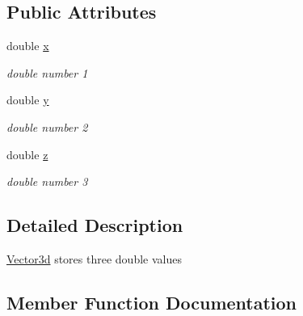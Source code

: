 \subsection*{Public Attributes}
\begin{DoxyCompactItemize}
\item 
\mbox{\label{classCPlantBox_1_1Vector3d_a5be396386dceda4e3f0847a760e67c08}} 
double \hyperlink{classCPlantBox_1_1Vector3d_a5be396386dceda4e3f0847a760e67c08}{x}
\begin{DoxyCompactList}\small\item\em double number 1 \end{DoxyCompactList}\item 
\mbox{\label{classCPlantBox_1_1Vector3d_a2c3ab20e8adc6170236011246f59d4b4}} 
double \hyperlink{classCPlantBox_1_1Vector3d_a2c3ab20e8adc6170236011246f59d4b4}{y}
\begin{DoxyCompactList}\small\item\em double number 2 \end{DoxyCompactList}\item 
\mbox{\label{classCPlantBox_1_1Vector3d_adbb591ec0af9aa04c331f752b9d06f54}} 
double \hyperlink{classCPlantBox_1_1Vector3d_adbb591ec0af9aa04c331f752b9d06f54}{z}
\begin{DoxyCompactList}\small\item\em double number 3 \end{DoxyCompactList}\end{DoxyCompactItemize}


\subsection{Detailed Description}
\hyperlink{classCPlantBox_1_1Vector3d}{Vector3d} stores three double values 

\subsection{Member Function Documentation}
\mbox{\label{classCPlantBox_1_1Vector3d_abecea9fab84647e0dafabaf667d99c5b}} 
